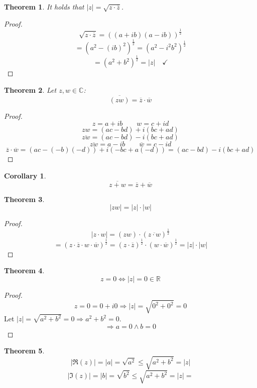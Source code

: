 \documentclass[a4paper,landscape,twocolumn]{article}
\newtheorem{theorem}{Theorem}
\newtheorem{cor}{Corollary}
\newcommand\abs[1]{\left|#1\right|}
\begin{document}
\begin{theorem}
  It holds that $\abs{z} = \sqrt{z \cdot \overline{z}}$.
\end{theorem}

\begin{proof}
  \[ \sqrt{z \cdot \overline{z}} = ((a + ib)(a - ib))^{\frac12} \]
  \[ = (a^2 - (ib)^2)^{\frac12} = (a^2 - i^2 b^2)^{\frac12} \]
  \[ = (a^2 + b^2)^{\frac12} = \abs{z} \quad\checkmark \]
\end{proof}

\begin{theorem}
  Let $z, w \in \mathbb C$:
  \[ \overline{(zw)} = \overline z \cdot \overline w \]
\end{theorem}

\begin{proof}
  \[ z = a + ib \qquad w = c + id \]
  \[ zw = (ac - bd) + i (bc + ad) \]
  \[ \overline{zw} = (ac - bd) - i (bc + ad) \]
  \[ \overline{zw} = a - ib \qquad \overline{w} = c - id \]
  \[
      \overline{z} \cdot \overline{w} = (ac - (-b) (-d)) + i (-bc + a(-d))
        = (ac - bd) - i (bc + ad)
  \]
\end{proof}

\begin{cor}
  \[ \overline{z + w} = \overline{z} + \overline{w} \]
\end{cor}

\begin{theorem}
  \[ \abs{zw} = \abs{z} \cdot \abs{w} \]
\end{theorem}
\begin{proof}
  \[ \abs{z \cdot w} = (zw) \cdot(\overline{z \cdot w})^{\frac12} \]
  \[
      = (z \cdot \overline z \cdot w \cdot \overline w)^{\frac12}
      = (z \cdot \overline z)^{\frac12} \cdot (w \cdot \overline w)^{\frac12}
      = \abs{z} \cdot \abs{w}
  \]
\end{proof}

\begin{theorem}
  \[ z = 0 \Leftrightarrow \abs{z} = 0 \in \mathbb R \]
\end{theorem}

\begin{proof}
  \[ z = 0 = 0 + i 0 \Rightarrow \abs{z} = \sqrt{0^2 + 0^2} = 0 \]
  Let $\abs{z} = \sqrt{a^2 + b^2} = 0 \Rightarrow a^2 + b^2 = 0$.
  \[ \Rightarrow a = 0 \land b = 0 \]
\end{proof}

\begin{theorem}
  \[ \abs{\Re(z)} = \abs{a} = \sqrt{a^2} \leq \sqrt{a^2 + b^2} = \abs{z} \]
  \[ \abs{\Im(z)} = \abs{b} = \sqrt{b^2} \leq \sqrt{a^2 + b^2} = \abs{z} = \]
\end{theorem}
\end{document}
